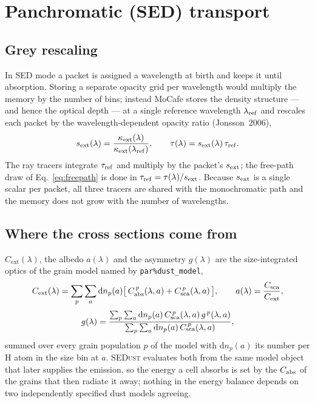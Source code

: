 \documentclass[english,a4paper]{kiseon_memo}
\newcommand{\kext}{\kappa_{\mathrm{ext}}}
\newcommand{\Cext}{C_{\mathrm{ext}}}
\newcommand{\dd}{\mathrm{d}}
\newcommand{\pp}[1]{\texttt{par\%#1}}
\begin{document}
\section{Panchromatic (SED) transport}\label{sec:sed}

\subsection{Grey rescaling}
In SED mode a packet is assigned a wavelength at birth and keeps it until
absorption.  Storing a separate opacity grid per wavelength would multiply the
memory by the number of bins; instead MoCafe stores the density structure --- and
hence the optical depth --- at a single reference wavelength $\lambda_{\rm ref}$
and rescales each packet by the wavelength-dependent opacity ratio
(Jonsson~2006),
\begin{equation}
  s_{\rm ext}(\lambda) = \frac{\kext(\lambda)}{\kext(\lambda_{\rm ref})},
  \qquad
  \tau(\lambda) = s_{\rm ext}(\lambda)\,\tau_{\rm ref}.
  \label{eq:grey}
\end{equation}
The ray tracers integrate $\tau_{\rm ref}$ and multiply by the packet's
$s_{\rm ext}$; the free-path draw of Eq.~\eqref{eq:freepath} is done in
$\tau_{\rm ref}=\tau(\lambda)/s_{\rm ext}$.  Because $s_{\rm ext}$ is a single
scalar per packet, all three tracers are shared with the monochromatic path and
the memory does not grow with the number of wavelengths.

\subsection{Where the cross sections come from}\label{sec:optics}
$\Cext(\lambda)$, the albedo $a(\lambda)$ and the asymmetry $g(\lambda)$ are the
size-integrated optics of the grain model named by \pp{dust\_model},
\begin{equation}
  \Cext(\lambda) = \sum_{p}\sum_{a} \dd n_p(a)
     \big[\,C_{\rm abs}^{\,p}(\lambda,a) + C_{\rm sca}^{\,p}(\lambda,a)\,\big],
  \qquad
  a(\lambda) = \frac{C_{\rm sca}}{\Cext},
  \label{eq:sizeint}
\end{equation}
\begin{equation}
  g(\lambda) = \frac{\sum_p\sum_a \dd n_p(a)\,C_{\rm sca}^{\,p}(\lambda,a)\,
                     g^{\,p}(\lambda,a)}
                    {\sum_p\sum_a \dd n_p(a)\,C_{\rm sca}^{\,p}(\lambda,a)},
  \label{eq:gbar}
\end{equation}
summed over every grain population $p$ of the model with $\dd n_p(a)$ its number
per H atom in the size bin at $a$.  \textsc{SEDust} evaluates both from the same
model object that later supplies the emission, so the energy a cell absorbs is
set by the $C_{\rm abs}$ of the grains that then radiate it away; nothing in the
energy balance depends on two independently specified dust models agreeing.
\end{document}
